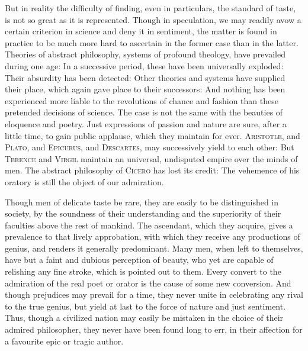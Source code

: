 But in reality the difficulty of finding, even in particulars, the
standard of taste, is not so great as it is represented. Though in
speculation, we may readily avow a certain criterion in science and
deny it in sentiment, the matter is found in practice to be much more
hard to ascertain in the former case than in the latter. Theories of
abstract philosophy, systems of profound theology, have prevailed
during one age: In a successive period, these have been universally
exploded: Their absurdity has been detected: Other theories and
systems have supplied their place, which again gave place to their
successors: And nothing has been experienced more liable to the
revolutions of chance and fashion than these pretended decisions of
science. The case is not the same with the beauties of eloquence and
poetry. Just expressions of passion and nature are sure, after a
little time, to gain  public applause, which they maintain
for ever. \textsc{Aristotle}, and \textsc{Plato}, and
\textsc{Epicurus}, and \textsc{Descartes}, may successively yield to
each other: But \textsc{Terence} and \textsc{Virgil} maintain an
universal, undisputed empire over the minds of men. The abstract
philosophy of \textsc{Cicero} has lost its credit: The vehemence of
his oratory is still the object of our admiration.


Though men of delicate taste be rare, they are easily to be
distinguished in society, by the soundness of their understanding and
the superiority of their faculties above the rest of mankind. The
ascendant, which they acquire, gives a prevalence to that lively
approbation, with which they receive any productions of genius, and
renders it generally predominant. Many men, when left to themselves,
have but a faint and dubious perception of beauty, who yet are capable
of relishing any fine stroke, which is pointed out to them. Every
convert to the admiration of the real poet or orator is the cause of
some new conversion. And though prejudices may prevail for a time,
they never unite in celebrating any rival to the true genius, but
yield at last to the force of nature and just sentiment. Thus, though
a civilized nation may easily be mistaken in the choice of their
admired philosopher, they never have been found long to err, in their
affection for a favourite epic or tragic author.

